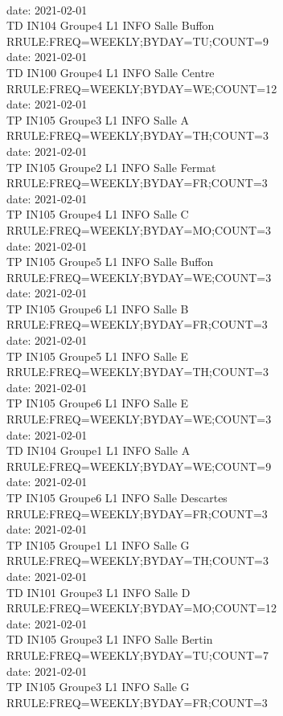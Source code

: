 \documentclass{ltxdoc}
\begin{document}
\begin{center}
\\ date: 2021-02-01\\TD  IN104  Groupe4  L1 INFO  Salle Buffon\\RRULE:FREQ=WEEKLY;BYDAY=TU;COUNT=9
\\ date: 2021-02-01\\TD  IN100  Groupe4  L1 INFO  Salle Centre\\RRULE:FREQ=WEEKLY;BYDAY=WE;COUNT=12
\\ date: 2021-02-01\\TP  IN105  Groupe3  L1 INFO  Salle A\\RRULE:FREQ=WEEKLY;BYDAY=TH;COUNT=3
\\ date: 2021-02-01\\TP  IN105  Groupe2  L1 INFO  Salle Fermat\\RRULE:FREQ=WEEKLY;BYDAY=FR;COUNT=3
\\ date: 2021-02-01\\TP  IN105  Groupe4  L1 INFO  Salle C\\RRULE:FREQ=WEEKLY;BYDAY=MO;COUNT=3
\\ date: 2021-02-01\\TP  IN105  Groupe5  L1 INFO  Salle Buffon\\RRULE:FREQ=WEEKLY;BYDAY=WE;COUNT=3
\\ date: 2021-02-01\\TP  IN105  Groupe6  L1 INFO  Salle B\\RRULE:FREQ=WEEKLY;BYDAY=FR;COUNT=3
\\ date: 2021-02-01\\TP  IN105  Groupe5  L1 INFO  Salle E\\RRULE:FREQ=WEEKLY;BYDAY=TH;COUNT=3
\\ date: 2021-02-01\\TP  IN105  Groupe6  L1 INFO  Salle E\\RRULE:FREQ=WEEKLY;BYDAY=WE;COUNT=3
\\ date: 2021-02-01\\TD  IN104  Groupe1  L1 INFO  Salle A\\RRULE:FREQ=WEEKLY;BYDAY=WE;COUNT=9
\\ date: 2021-02-01\\TP  IN105  Groupe6  L1 INFO  Salle Descartes\\RRULE:FREQ=WEEKLY;BYDAY=FR;COUNT=3
\\ date: 2021-02-01\\TP  IN105  Groupe1  L1 INFO  Salle G\\RRULE:FREQ=WEEKLY;BYDAY=TH;COUNT=3
\\ date: 2021-02-01\\TD  IN101  Groupe3  L1 INFO  Salle D\\RRULE:FREQ=WEEKLY;BYDAY=MO;COUNT=12
\\ date: 2021-02-01\\TD  IN105  Groupe3  L1 INFO  Salle Bertin\\RRULE:FREQ=WEEKLY;BYDAY=TU;COUNT=7
\\ date: 2021-02-01\\TP  IN105  Groupe3  L1 INFO  Salle G\\RRULE:FREQ=WEEKLY;BYDAY=FR;COUNT=3

\end{center}
\end{document}

